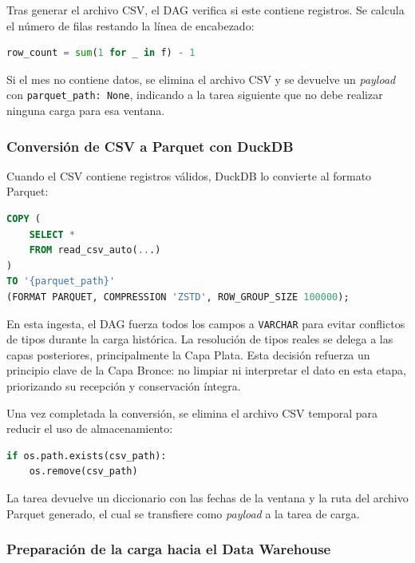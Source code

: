 Tras generar el archivo CSV, el DAG verifica si este contiene registros. Se calcula el número de filas restando la línea de encabezado:

\begin{lstlisting}[language=Python, breaklines=true]
row_count = sum(1 for _ in f) - 1
\end{lstlisting}

Si el mes no contiene datos, se elimina el archivo CSV y se devuelve un \textit{payload} con \texttt{parquet\_path: None}, indicando a la tarea siguiente que no debe realizar ninguna carga para esa ventana.

\subsubsection{Conversión de CSV a Parquet con DuckDB}

Cuando el CSV contiene registros válidos, DuckDB lo convierte al formato Parquet:

\begin{lstlisting}[language=SQL, breaklines=true]
COPY (
    SELECT *
    FROM read_csv_auto(...)
)
TO '{parquet_path}'
(FORMAT PARQUET, COMPRESSION 'ZSTD', ROW_GROUP_SIZE 100000);
\end{lstlisting}

En esta ingesta, el DAG fuerza todos los campos a \texttt{VARCHAR} para evitar conflictos de tipos durante la carga histórica. La resolución de tipos reales se delega a las capas posteriores, principalmente la Capa Plata. Esta decisión refuerza un principio clave de la Capa Bronce: no limpiar ni interpretar el dato en esta etapa, priorizando su recepción y conservación íntegra.

Una vez completada la conversión, se elimina el archivo CSV temporal para reducir el uso de almacenamiento:

\begin{lstlisting}[language=Python, breaklines=true]
if os.path.exists(csv_path):
    os.remove(csv_path)
\end{lstlisting}

La tarea devuelve un diccionario con las fechas de la ventana y la ruta del archivo Parquet generado, el cual se transfiere como \textit{payload} a la tarea de carga.

\subsubsection{Preparación de la carga hacia el Data Warehouse}

